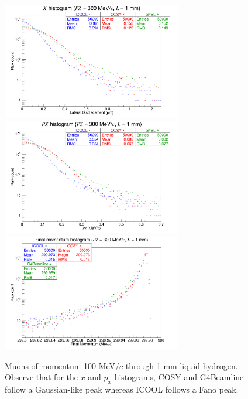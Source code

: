 \begin{figure}[H]
  \centering
    \includegraphics[width=0.7\textwidth]{Benchmarking/LH/X.300.1.png} 
    \includegraphics[width=0.7\textwidth]{Benchmarking/LH/PX.300.1.png} 
    \includegraphics[width=0.7\textwidth]{Benchmarking/LH/strag.300.1.png} 
  \caption[Muons of momentum 300 MeV/$c$ through 1 mm liquid hydrogen.]{Muons of momentum 100 MeV/$c$ through 1 mm liquid hydrogen. Observe that for the $x$ and $p_x$ histograms, COSY and G4Beamline follow a Gaussian-like peak whereas ICOOL follows a Fano peak.}
  \label{fig:300.1}
\end{figure}


